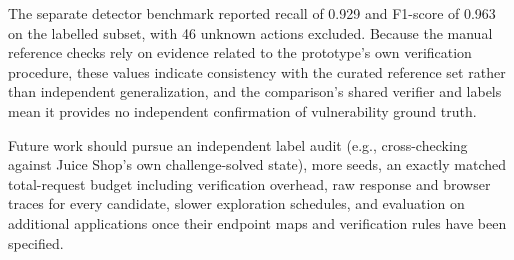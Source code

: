 \documentclass[conference, a4paper]{IEEEtran}
\begin{document}
The separate detector benchmark reported recall of 0.929 and
F1-score of 0.963 on the labelled subset, with 46 unknown actions
excluded. Because the manual reference checks rely on evidence
related to the prototype's own verification procedure, these values
indicate consistency with the curated reference set rather than
independent generalization, and the comparison's shared verifier and
labels mean it provides no independent confirmation of vulnerability
ground truth.

Future work should pursue an independent label audit (e.g.,
cross-checking against Juice Shop's own challenge-solved state),
more seeds, an exactly matched total-request budget including
verification overhead, raw response and browser traces for every
candidate, slower exploration schedules, and evaluation on
additional applications once their endpoint maps and verification
rules have been specified.
\end{document}
